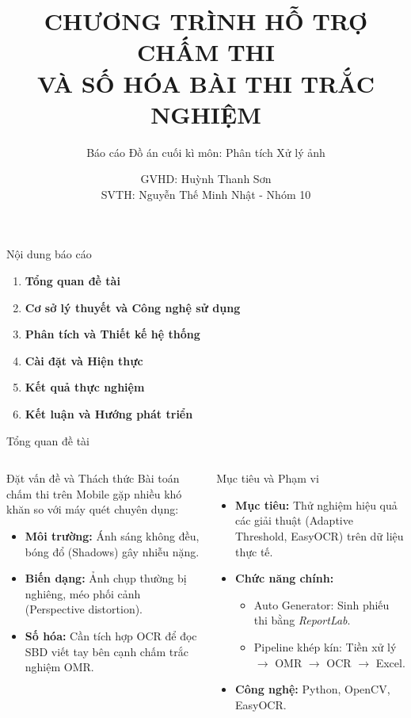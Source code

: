 \documentclass[10pt, aspectratio=169]{beamer}
\title[SmartGrader]{CHƯƠNG TRÌNH HỖ TRỢ CHẤM THI \\ VÀ SỐ HÓA BÀI THI TRẮC NGHIỆM}
\subtitle{Báo cáo Đồ án cuối kì môn: Phân tích Xử lý ảnh}
\author[Nhóm 10]{GVHD: Huỳnh Thanh Sơn \\ SVTH: Nguyễn Thế Minh Nhật - Nhóm 10}
\institute[HCMUS]{Trường Đại học Khoa học Tự nhiên, ĐHQG-HCM}
\date{}
\begin{document}
	
	\begin{frame}
		\titlepage
	\end{frame}
	
	\begin{frame}{Nội dung báo cáo}
		\begin{enumerate}
			\setlength\itemsep{0.8em} %
			\item \textbf{Tổng quan đề tài}
			\item \textbf{Cơ sở lý thuyết và Công nghệ sử dụng}
			\item \textbf{Phân tích và Thiết kế hệ thống}
			\item \textbf{Cài đặt và Hiện thực}
			\item \textbf{Kết quả thực nghiệm}
			\item \textbf{Kết luận và Hướng phát triển}
		\end{enumerate}
	\end{frame}
	
	\begin{frame}{Tổng quan đề tài}
		\small 
		
		\begin{columns}[t] 
			\column{0.48\textwidth}
			\begin{block}{Đặt vấn đề và Thách thức}
				Bài toán chấm thi trên Mobile gặp nhiều khó khăn so với máy quét chuyên dụng:
				\begin{itemize}
					\item \textbf{Môi trường:} Ánh sáng không đều, bóng đổ (Shadows) gây nhiễu nặng.
					\item \textbf{Biến dạng:} Ảnh chụp thường bị nghiêng, méo phối cảnh (Perspective distortion).
					\item \textbf{Số hóa:} Cần tích hợp OCR để đọc SBD viết tay bên cạnh chấm trắc nghiệm OMR.
				\end{itemize}
			\end{block}
			
			\column{0.48\textwidth}
			\begin{block}{Mục tiêu và Phạm vi}
				\begin{itemize}
					\item \textbf{Mục tiêu:} Thử nghiệm hiệu quả các giải thuật (Adaptive Threshold, EasyOCR) trên dữ liệu thực tế.
					\item \textbf{Chức năng chính:}
					\begin{itemize}
						\item Auto Generator: Sinh phiếu thi bằng \textit{ReportLab}.
						\item Pipeline khép kín: Tiền xử lý $\to$ OMR $\to$ OCR $\to$ Excel.
					\end{itemize}
					\item \textbf{Công nghệ:} Python, OpenCV, EasyOCR.
				\end{itemize}
			\end{block}
		\end{columns}
	\end{frame}
	
\end{document}

